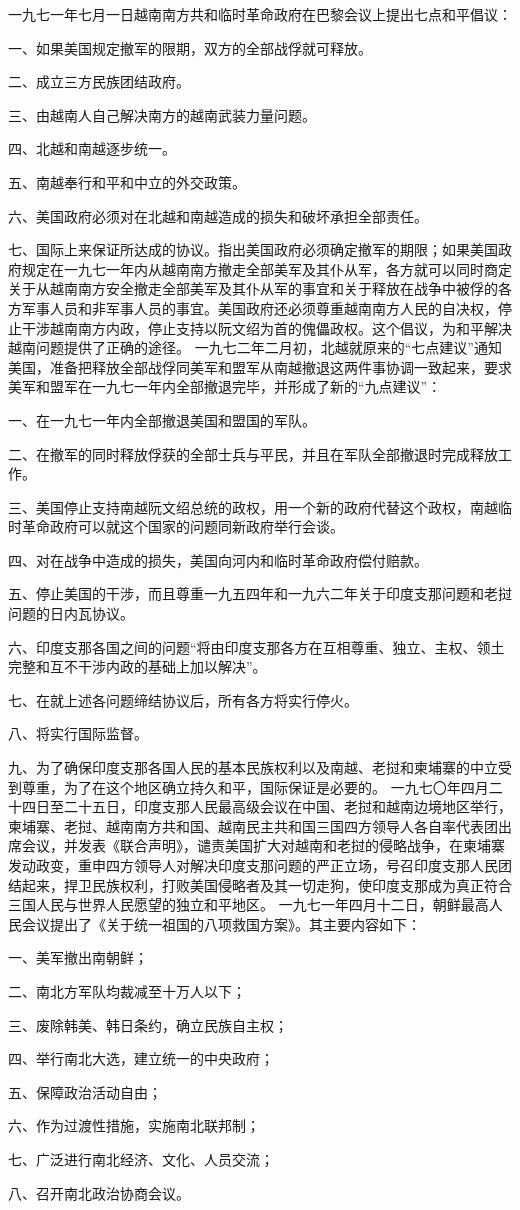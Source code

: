 \begin{maonote}
一九七一年七月一日越南南方共和临时革命政府在巴黎会议上提出七点和平倡议：

一、如果美国规定撤军的限期，双方的全部战俘就可释放。

二、成立三方民族团结政府。

三、由越南人自己解决南方的越南武装力量问题。

四、北越和南越逐步统一。

五、南越奉行和平和中立的外交政策。

六、美国政府必须对在北越和南越造成的损失和破坏承担全部责任。

七、国际上来保证所达成的协议。指出美国政府必须确定撤军的期限；如果美国政府规定在一九七一年内从越南南方撤走全部美军及其仆从军，各方就可以同时商定关于从越南南方安全撤走全部美军及其仆从军的事宜和关于释放在战争中被俘的各方军事人员和非军事人员的事宜。美国政府还必须尊重越南南方人民的自决权，停止干涉越南南方内政，停止支持以阮文绍为首的傀儡政权。这个倡议，为和平解决越南问题提供了正确的途径。
一九七二年二月初，北越就原来的“七点建议”通知美国，准备把释放全部战俘同美军和盟军从南越撤退这两件事协调一致起来，要求美军和盟军在一九七一年内全部撤退完毕，并形成了新的“九点建议”：

一、在一九七一年内全部撤退美国和盟国的军队。

二、在撤军的同时释放俘获的全部士兵与平民，并且在军队全部撤退时完成释放工作。

三、美国停止支持南越阮文绍总统的政权，用一个新的政府代替这个政权，南越临时革命政府可以就这个国家的问题同新政府举行会谈。

四、对在战争中造成的损失，美国向河内和临时革命政府偿付赔款。

五、停止美国的干涉，而且尊重一九五四年和一九六二年关于印度支那问题和老挝问题的日内瓦协议。

六、印度支那各国之间的问题“将由印度支那各方在互相尊重、独立、主权、领土完整和互不干涉内政的基础上加以解决”。

七、在就上述各问题缔结协议后，所有各方将实行停火。

八、将实行国际监督。

九、为了确保印度支那各国人民的基本民族权利以及南越、老挝和柬埔寨的中立受到尊重，为了在这个地区确立持久和平，国际保证是必要的。
一九七〇年四月二十四日至二十五日，印度支那人民最高级会议在中国、老挝和越南边境地区举行，柬埔寨、老挝、越南南方共和国、越南民主共和国三国四方领导人各自率代表团出席会议，并发表《联合声明》，谴责美国扩大对越南和老挝的侵略战争，在柬埔寨发动政变，重申四方领导人对解决印度支那问题的严正立场，号召印度支那人民团结起来，捍卫民族权利，打败美国侵略者及其一切走狗，使印度支那成为真正符合三国人民与世界人民愿望的独立和平地区。
一九七一年四月十二日，朝鲜最高人民会议提出了《关于统一祖国的八项救国方案》。其主要内容如下：

一、美军撤出南朝鲜；

二、南北方军队均裁减至十万人以下；

三、废除韩美、韩日条约，确立民族自主权；

四、举行南北大选，建立统一的中央政府；

五、保障政治活动自由；

六、作为过渡性措施，实施南北联邦制；

七、广泛进行南北经济、文化、人员交流；

八、召开南北政治协商会议。
\end{maonote}
